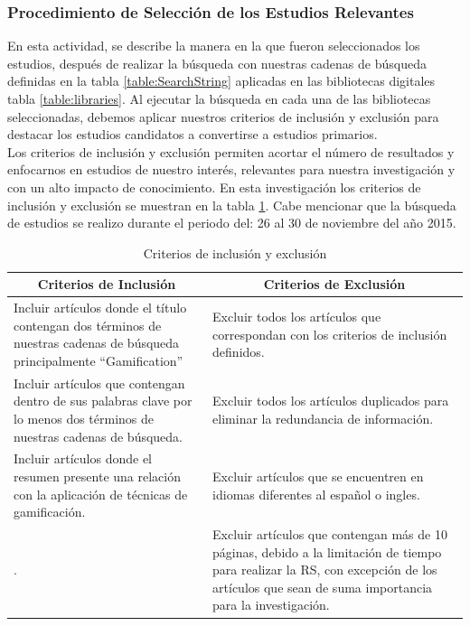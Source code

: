 \documentclass{report}
\begin{document}
            \subsubsection{Procedimiento de Selección de los Estudios Relevantes}
    
	        En esta actividad, se describe la manera en la que fueron seleccionados los estudios, después de realizar la búsqueda con nuestras cadenas de búsqueda definidas en la tabla \ref{table:SearchString} aplicadas en las bibliotecas digitales tabla \ref{table:libraries}. Al ejecutar la búsqueda en cada una de las bibliotecas seleccionadas, debemos aplicar nuestros criterios de inclusión y exclusión para destacar los estudios candidatos a convertirse a estudios primarios.\\
    	    Los criterios de inclusión y exclusión permiten acortar el número de resultados y enfocarnos en estudios de nuestro interés, relevantes para nuestra investigación y con un alto impacto de conocimiento. En esta investigación los criterios de inclusión y exclusión se muestran en la tabla \ref{table:criterios}. Cabe mencionar que la búsqueda de estudios se realizo durante el periodo del: 26 al 30 de noviembre del año 2015.\\
        	\begin{table}
                \begin{center}
                    \caption{Criterios de inclusión y exclusión}
                    \label{table:criterios}
                    \begin{tabular}{| p{7cm} | p{7cm} |}
                        \toprule
                        \hline
                        \multicolumn{1}{|c|}{\textbf{Criterios de Inclusión}} & \multicolumn{1}{|c|}{\textbf{Criterios de Exclusión}} \\
                        \hline
                        Incluir artículos donde el título contengan dos términos de nuestras cadenas de búsqueda principalmente ``Gamification''{ }& Excluir todos los artículos que correspondan con los criterios de inclusión definidos.\\
                        \hline
                        Incluir artículos que contengan dentro de sus palabras clave por lo menos dos términos de nuestras cadenas de búsqueda. & Excluir todos los artículos duplicados para eliminar la redundancia de información.\\
                        \hline
                        Incluir artículos donde el resumen presente una relación con la aplicación de técnicas de gamificación. & Excluir artículos que se encuentren en idiomas diferentes al español o ingles.\\
                        \hline
                        . & Excluir artículos que contengan más de 10 páginas, debido a la limitación de tiempo para realizar la RS, con excepción de los artículos que sean de suma importancia para la investigación.\\
                        \hline
                    \end{tabular}
                \end{center}
            \end{table}
\end{document}
